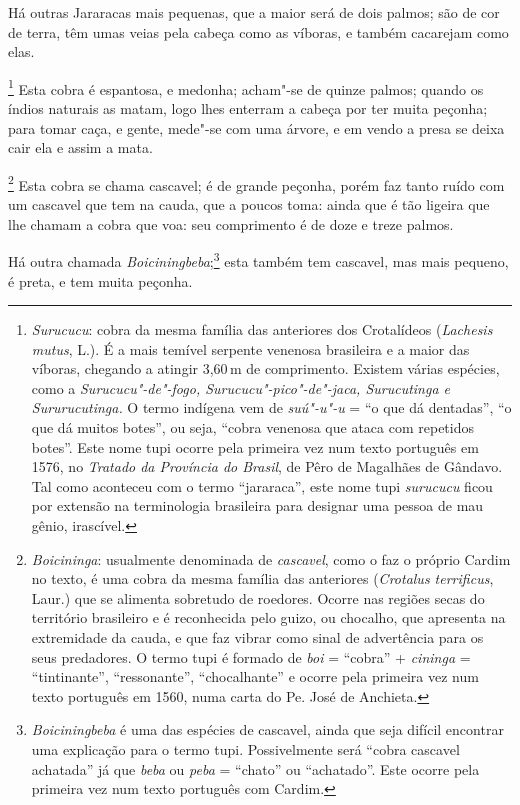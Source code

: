  Há outras Jararacas mais pequenas, que a maior será de dois palmos; são
de cor de terra, têm umas veias pela cabeça como as víboras, e também
cacarejam como elas.

\footnote{ \textit{Surucucu}: cobra da mesma
família das anteriores dos Crotalídeos (\textit{Lachesis mutus}, L.).
É a mais temível serpente venenosa brasileira e a maior das víboras,
chegando a atingir 3,60\,m de comprimento. Existem várias espécies, como
a \textit{Surucucu"-de"-fogo, Surucucu"-pico"-de"-jaca, Surucutinga e
Sururucutinga.} O termo indígena vem de \textit{suú"-u"-u} = ``o que dá
dentadas'', ``o que dá muitos botes'', ou seja, ``cobra venenosa que ataca
com repetidos botes''. Este nome tupi ocorre pela primeira vez num texto
português em 1576, no \textit{Tratado da Província do Brasil}, de Pêro de
Magalhães de Gândavo. Tal como aconteceu com o termo ``jararaca'', este
nome tupi \textit{surucucu} ficou por extensão na terminologia
brasileira para designar uma pessoa de mau gênio, irascível.} 
Esta cobra é espantosa, e medonha; acham"-se de quinze
palmos; quando os índios naturais as matam, logo lhes enterram a cabeça
por ter muita peçonha; para tomar caça, e gente, mede"-se com uma
árvore, e em vendo a presa se deixa cair ela e assim a mata. 

\footnote{ \textit{Boicininga}: usualmente
denominada de \textit{cascavel}, como o faz o próprio Cardim no texto,
é uma cobra da mesma família das anteriores (\textit{Crotalus
terrificus}, Laur.) que se alimenta sobretudo de roedores. Ocorre nas
regiões secas do território brasileiro e é reconhecida pelo guizo, ou
chocalho, que apresenta na extremidade da cauda, e que faz vibrar como
sinal de advertência para os seus predadores. O termo tupi é formado
de \textit{boi} = ``cobra'' + \textit{cininga} = ``tintinante'',
``ressonante'', ``chocalhante'' e ocorre pela primeira vez num texto
português em 1560, numa carta do Pe. José de
Anchieta.} Esta cobra se chama cascavel; é de grande peçonha,
porém faz tanto ruído com um cascavel que tem na cauda, que a poucos
toma: ainda que é tão ligeira que lhe chamam a cobra que voa: seu
comprimento é de doze e treze palmos.

 Há outra chamada \textit{Boiciningbeba};\footnote{ \textit{Boiciningbeba} 
é uma das espécies de cascavel, ainda que seja
difícil encontrar uma explicação para o termo tupi. Possivelmente será
``cobra cascavel achatada'' já que \textit{beba} ou \textit{peba} =
``chato'' ou ``achatado''. Este ocorre pela primeira vez num texto
português com Cardim.} esta também tem cascavel, mas mais pequeno, é
preta, e tem muita peçonha.

